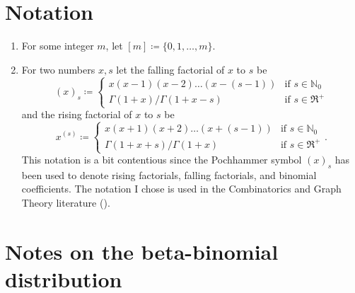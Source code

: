 \documentclass[../../main.tex]{subfiles}
\begin{document}
\section{Notation}

\begin{enumerate}
    \item For some integer $m$, let $[m] \coloneqq \{0, 1, \ldots, m\}$.
    \item For two numbers $x, s$ let the falling factorial of $x$ to $s$ be \begin{equation}
        (x)_s \coloneqq \begin{cases} x(x - 1)(x - 2)\ldots(x - (s - 1)) & \text{if } s \in \mathbb{N}_0 \\
       \Gamma(1 + x) \Big/ \Gamma(1 + x - s)& \text{if } s \in \Re^{+}
        \end{cases}
    \end{equation} and the rising factorial of $x$ to $s$ be \begin{equation}
        x^{(s)} \coloneqq \begin{cases} x(x + 1)(x + 2)\ldots(x + (s - 1)) & \text{if } s \in \mathbb{N}_0 \\
            \Gamma(1 + x + s) \Big/ \Gamma(1 + x)& \text{if } s \in \Re^{+}
             \end{cases}.
    \end{equation} This notation is a bit contentious since the Pochhammer symbol $(x)_s$ has been used to denote rising factorials, falling factorials, and binomial coefficients. The notation I chose is used in the Combinatorics and Graph Theory literature (\cite{harris_combinatorics_2008}).
\end{enumerate}

\section{Notes on the beta-binomial distribution}
\end{document}
